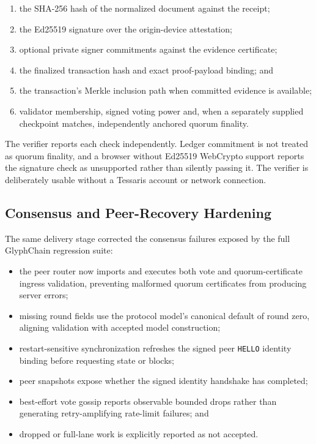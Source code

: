 \begin{enumerate}
  \item the SHA-256 hash of the normalized document against the receipt;
  \item the Ed25519 signature over the origin-device attestation;
  \item optional private signer commitments against the evidence certificate;
  \item the finalized transaction hash and exact proof-payload binding; and
  \item the transaction's Merkle inclusion path when committed evidence is
        available;
  \item validator membership, signed voting power and, when a separately
        supplied checkpoint matches, independently anchored quorum finality.
\end{enumerate}

The verifier reports each check independently.  Ledger commitment is not
treated as quorum finality, and a browser without Ed25519 WebCrypto
support reports the signature check as unsupported rather than silently passing
it.  The verifier is deliberately usable without a Tessaris account or network
connection.

\subsection{Consensus and Peer-Recovery Hardening}

The same delivery stage corrected the consensus failures exposed by the full
GlyphChain regression suite:

\begin{itemize}
  \item the peer router now imports and executes both vote and quorum-certificate
        ingress validation, preventing malformed quorum certificates from
        producing server errors;
  \item missing round fields use the protocol model's canonical default of round
        zero, aligning validation with accepted model construction;
  \item restart-sensitive synchronization refreshes the signed peer
        \texttt{HELLO} identity binding before requesting state or blocks;
  \item peer snapshots expose whether the signed identity handshake has
        completed;
  \item best-effort vote gossip reports observable bounded drops rather than
        generating retry-amplifying rate-limit failures; and
  \item dropped or full-lane work is explicitly reported as not accepted.
\end{itemize}


